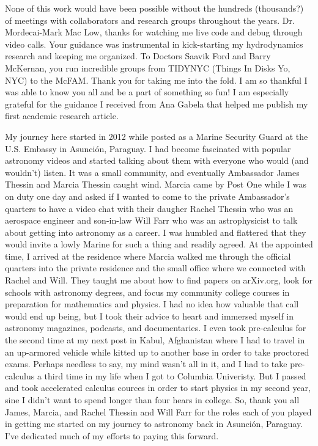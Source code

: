 None of this work would have been possible without the hundreds (thousands?) of meetings with collaborators and research groups throughout the years.
Dr. Mordecai-Mark Mac Low, thanks for watching me live code and debug through video calls.
Your guidance was instrumental in kick-starting my hydrodynamics research and keeping me organized.
To Doctors Saavik Ford and Barry McKernan, you run incredible groups from TIDYNYC (Things In Disks Yo, NYC) to the McFAM.
Thank you for taking me into the fold.
I am so thankful I was able to know you all and be a part of something so fun!
I am especially grateful for the guidance I received from Ana Gabela that helped me publish my first academic research article.

My journey here started in 2012 while posted as a Marine Security Guard at the U.S. Embassy in Asunci\'on, Paraguay.
I had become fascinated with popular astronomy videos and started talking about them with everyone who would (and wouldn't) listen.
It was a small community, and eventually Ambassador James Thessin and Marcia Thessin caught wind.
Marcia came by Post One while I was on duty one day and asked if I wanted to come to the private Ambassador's quarters to have a video chat with their daugher Rachel Thessin who was an aerospace engineer and son-in-law Will Farr who was an astrophysicist to talk about getting into astronomy as a career.
I was humbled and flattered that they would invite a lowly Marine for such a thing and readily agreed.
At the appointed time, I arrived at the residence where Marcia walked me through the official quarters into the private residence and the small office where we connected with Rachel and Will.
They taught me about how to find papers on arXiv.org, look for schools with astronomy degrees, and focus my community college courses in preparation for mathematics and physics.
I had no idea how valuable that call would end up being, but I took their advice to heart and immersed myself in astronomy magazines, podcasts, and documentaries.
I even took pre-calculus for the second time at my next post in Kabul, Afghanistan where I had to travel in an up-armored vehicle while kitted up to another base in order to take proctored exams.
Perhaps needless to say, my mind wasn't all in it, and I had to take pre-calculus a third time in my life when I got to Columbia Univeristy.
But I passed and took accelerated calculus cources in order to start physics in my second year, sine I didn't want to spend longer than four hears in college.
So, thank you all James, Marcia, and Rachel Thessin and Will Farr for the roles each of you played in getting me started on my journey to astronomy back in Asunci\'on, Paraguay.
I've dedicated much of my efforts to paying this forward.

